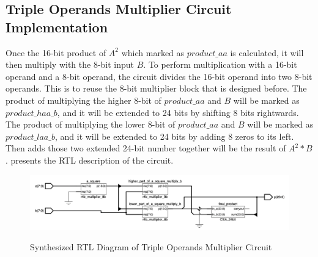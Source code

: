 \subsection{Triple Operands Multiplier Circuit Implementation}

Once the 16-bit product of \textbf{\(A^2\)} which marked as \(product\_aa\) is calculated, it will then multiply with the 8-bit input \(B\).
To perform multiplication with a 16-bit operand and a 8-bit operand, the circuit divides the 16-bit operand into two 8-bit operands.
This is to reuse the 8-bit multiplier block that is designed before.
The product of multiplying the higher 8-bit of \(product\_aa\) and \(B\) will be marked as \(product\_haa\_b\), and it will be extended to 24 bits by shifting 8 bits rightwards.
The product of multiplying the lower 8-bit of \(product\_aa\) and \(B\) will be marked as \(product\_laa\_b\), and it will be extended to 24 bits by adding 8 zeros to its left.
Then adds those two extended 24-bit number together will be the result of \textbf{\(A^2 \ast B\)}.
 presents the RTL description of the circuit.

\begin{figure}[!htp]
	\centering
	\caption{Synthesized RTL Diagram of Triple Operands Multiplier Circuit}
	\includegraphics[width=\textwidth]{../img/tri_rtl.png}
	\label{fig:tri_rtl}
\end{figure}
